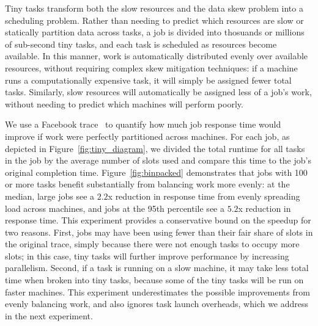 Tiny tasks transform both the slow resources and the data skew problem
into a scheduling problem.  Rather than needing to predict which resources
are slow or statically partition data across tasks, a job is divided into
thosuands or millions of sub-second tiny tasks, and each task is scheduled
as resources become available.  In this manner, work is automatically
distributed evenly over available resources, without requiring complex skew
mitigation techniques: if a machine runs a computationally expensive task, it
will simply be assigned fewer total tasks.  Similarly, slow resources will
automatically be assigned less of a job's work, without needing to predict which
machines will perform poorly.

We use a Facebook trace~\cite{chen2012interactive} to quantify how much job response time would
improve if work were perfectly partitioned across machines.
For each job, as depicted in Figure~\ref{fig:tiny_diagram}, we divided the total runtime for all tasks in the
job by the average number of slots used and compare this time to the job's
original completion time.
Figure~\ref{fig:binpacked}
demonstrates that jobs with 100 or more tasks benefit substantially from
balancing work more evenly: at the median, large jobs see
a $2.2$x reduction in response time from evenly spreading load
across machines, and
jobs at the 95th percentile see a $5.2$x reduction in response time.
This experiment provides a conservative bound on the speedup for two reasons. First, jobs
may have been using fewer than their fair share of slots in the original trace,
simply because there were not enough tasks to occupy more slots; in this case,
tiny tasks will further improve performance by increasing parallelism. Second,
if a task is running on a slow machine, it may take less total time when
broken into tiny tasks, because some of the tiny tasks will be run on faster
machines.
This experiment underestimates the possible improvements from
evenly balancing work, and also ignores task launch overheads, which
we address in the next experiment.


